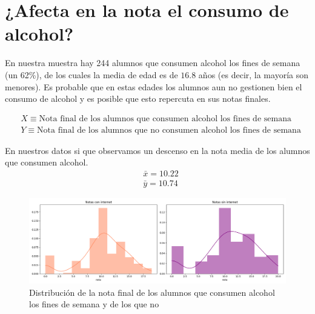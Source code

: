 \section{¿Afecta en la nota el consumo de alcohol?}

En nuestra muestra hay 244 alumnos que consumen alcohol los fines de semana (un 62\%), de los cuales la media de edad es de $16.8$ años (es decir, la mayoría son menores). Es probable que en estas edades los alumnos aun no gestionen bien el consumo de alcohol y es posible que esto repercuta en sus notas finales.

\begin{equation*}
    \begin{split}
        & X \equiv \text{Nota final de los alumnos que consumen alcohol los fines de semana}\\
        & Y \equiv \text{Nota final de los alumnos que no consumen alcohol los fines de semana}
    \end{split}
\end{equation*}

En nuestros datos si que observamos un descenso en la nota media de los alumnos que consumen alcohol.
\begin{equation*}
    \begin{split}
        & \bar{x} = 10.22\\
        & \bar{y} = 10.74
    \end{split}
\end{equation*}

\begin{figure}[H]
    \begin{center}
        \includegraphics[width=1\textwidth]{figures/dist-notas-walc.png}
    \end{center}
    \caption{Distribución de la nota final de los alumnos que consumen alcohol los fines de semana y de los que no}\label{fig:dist-notas-walc}
\end{figure}

